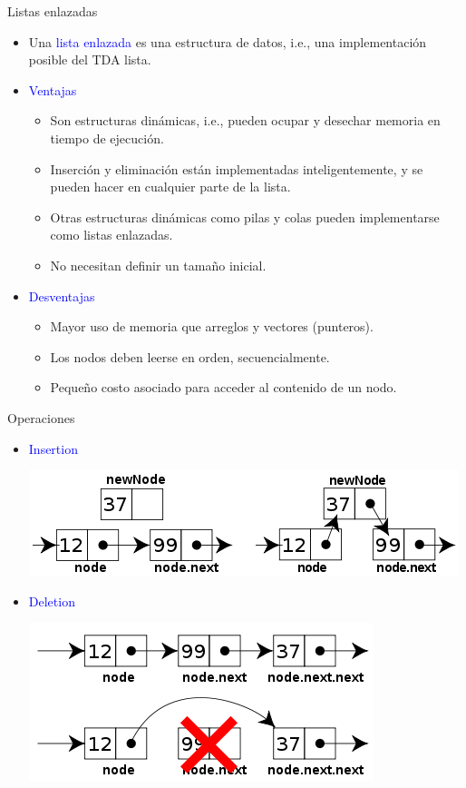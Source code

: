 \documentclass{beamer} %
\newcommand{\blue}[1]{\textcolor{blue}{#1}}
\begin{document}
\begin{frame}{Listas enlazadas}
    \begin{itemize}
        \item<1-> Una \blue{lista enlazada} es una estructura de datos, i.e., una implementación posible del TDA lista.
        \item<2-> \blue{Ventajas}
        \begin{itemize}
            \item Son estructuras dinámicas, i.e., pueden ocupar y desechar memoria en tiempo de ejecución.
            \item Inserción y eliminación están implementadas inteligentemente, y se pueden hacer en cualquier parte de la lista.
            \item Otras estructuras dinámicas como pilas y colas pueden implementarse como listas enlazadas.
            \item No necesitan definir un tamaño inicial.
        \end{itemize}
        \item<3-> \blue{Desventajas}
        \begin{itemize}
            \item Mayor uso de memoria que arreglos y vectores (punteros).
            \item Los nodos deben leerse en orden, secuencialmente.
            \item Pequeño costo asociado para acceder al contenido de un nodo.
        \end{itemize}
    \end{itemize}
\end{frame}

\begin{frame}{Operaciones}
    \begin{itemize}
        \item<1-> \blue{Insertion}
        
            \begin{center}
            \includegraphics[width=.7\textwidth]{./image/cap2/linked-list-insertion.png}
            \end{center}
        \item<2-> \blue{Deletion}
        
            \begin{center}
            \includegraphics[width=.6\textwidth]{./image/cap2/linked-list-deletion.png}
            \end{center}
    \end{itemize}
\end{frame}
\end{document}
